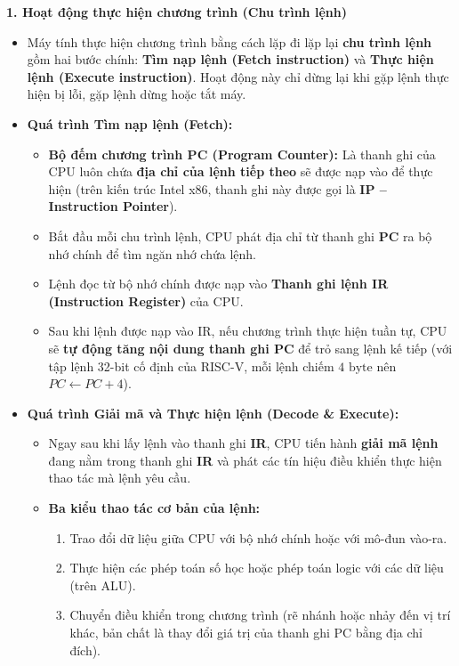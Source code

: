 \textbf{1. Hoạt động thực hiện chương trình (Chu trình lệnh)}
\begin{itemize}
    \item Máy tính thực hiện chương trình bằng cách lặp đi lặp lại \textbf{chu trình lệnh} gồm hai bước chính: \textbf{Tìm nạp lệnh (Fetch instruction)} và \textbf{Thực hiện lệnh (Execute instruction)}. Hoạt động này chỉ dừng lại khi gặp lệnh thực hiện bị lỗi, gặp lệnh dừng hoặc tắt máy.
    \item \textbf{Quá trình Tìm nạp lệnh (Fetch):}
    \begin{itemize}
        \item \textbf{Bộ đếm chương trình PC (Program Counter):} Là thanh ghi của CPU luôn chứa \textbf{địa chỉ của lệnh tiếp theo} sẽ được nạp vào để thực hiện (trên kiến trúc Intel x86, thanh ghi này được gọi là \textbf{IP -- Instruction Pointer}).
        \item Bắt đầu mỗi chu trình lệnh, CPU phát địa chỉ từ thanh ghi \textbf{PC} ra bộ nhớ chính để tìm ngăn nhớ chứa lệnh.
        \item Lệnh đọc từ bộ nhớ chính được nạp vào \textbf{Thanh ghi lệnh IR (Instruction Register)} của CPU.
        \item Sau khi lệnh được nạp vào IR, nếu chương trình thực hiện tuần tự, CPU sẽ \textbf{tự động tăng nội dung thanh ghi PC} để trỏ sang lệnh kế tiếp (với tập lệnh 32-bit cố định của RISC-V, mỗi lệnh chiếm $4\text{ byte}$ nên $PC \leftarrow PC + 4$).
    \end{itemize}
    \item \textbf{Quá trình Giải mã và Thực hiện lệnh (Decode \& Execute):}
    \begin{itemize}
        \item Ngay sau khi lấy lệnh vào thanh ghi \textbf{IR}, CPU tiến hành \textbf{giải mã lệnh} đang nằm trong thanh ghi \textbf{IR} và phát các tín hiệu điều khiển thực hiện thao tác mà lệnh yêu cầu.
        \item \textbf{Ba kiểu thao tác cơ bản của lệnh:}
        \begin{enumerate}
            \item Trao đổi dữ liệu giữa CPU với bộ nhớ chính hoặc với mô-đun vào-ra.
            \item Thực hiện các phép toán số học hoặc phép toán logic với các dữ liệu (trên ALU).
            \item Chuyển điều khiển trong chương trình (rẽ nhánh hoặc nhảy đến vị trí khác, bản chất là thay đổi giá trị của thanh ghi PC bằng địa chỉ đích).
        \end{enumerate}
    \end{itemize}
\end{itemize}

